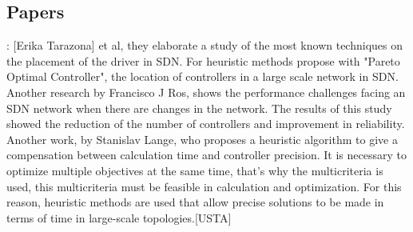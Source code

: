 \documentclass[a4paper,10pt]{article}
\begin{document}
\subsection{Papers}
\cite{TaAl17}: [Erika Tarazona] et al, they elaborate a study of the most known techniques on the placement of the driver in SDN.
For heuristic methods propose with "Pareto Optimal Controller", the location of controllers in a large scale network in SDN.
Another research by Francisco J Ros, shows the performance challenges facing an SDN network when there are changes in the network. The results of this study showed the reduction of the number of controllers and improvement in reliability.
Another work, by Stanislav Lange, who proposes a heuristic algorithm to give a compensation between calculation time and controller precision.
It is necessary to optimize multiple objectives at the same time, that's why the multicriteria is used, this multicriteria must be feasible in calculation and optimization. For this reason, heuristic methods are used that allow precise solutions to be made in terms of time in large-scale topologies.[USTA]

 

%
%
%
%
%
%
%
%
%











\end{document}
